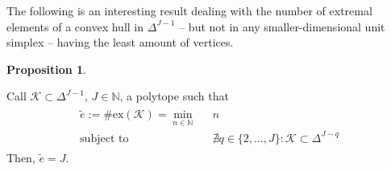 \documentclass[12pt, reqno]{amsart}
\theoremstyle{definition}
\newtheorem{proposition}[theorem]{Proposition}
\newtheorem{definition}[theorem]{Definition}
\begin{document}
The following is an interesting result dealing with the number of extremal elements of a convex hull in $\Delta^{J-1}$ -- but not in any smaller-dimensional unit simplex -- having the least amount of vertices.

\begin{proposition}\label{rema2}

Call $\mathscr{K}\subset \Delta^{J-1}$, $J\in\mathbb{N}$, a polytope such that
\begin{align}\label{ex_within}
\begin{split}
    \tilde{e}:=\#\text{ex}(\mathscr{K}) = \min_{n\in\mathbb{N}} \text{ } &n\\
    \text{subject to} \text{ } &\nexists q\in\{2,\ldots,J\} : \mathscr{K} \subset \Delta^{J-q}
\end{split}
\end{align}
Then, $\tilde{e}=J$.
\end{proposition}

\end{document}
